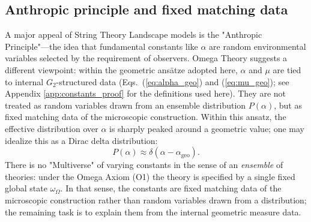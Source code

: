 \subsection{Anthropic principle and fixed matching data}
A major appeal of String Theory Landscape models is the "Anthropic Principle"---the idea that fundamental constants like $\alpha$ are random environmental variables selected by the requirement of observers.
Omega Theory suggests a different viewpoint: within the geometric ans\"atze adopted here, $\alpha$ and $\mu$ are tied to internal $G_2$-structured data (Eqs.~(\ref{eq:alpha_geo}) and (\ref{eq:mu_geo}); see Appendix \ref{app:constants_proof} for the definitions used here). They are not treated as random variables drawn from an ensemble distribution $P(\alpha)$, but as fixed matching data of the microscopic construction.
Within this ansatz, the effective distribution over $\alpha$ is sharply peaked around a geometric value; one may idealize this as a Dirac delta distribution:
\begin{equation}
    P(\alpha) \approx \delta(\alpha - \alpha_{\text{geo}}).
\end{equation}
There is no "Multiverse" of varying constants in the sense of an \emph{ensemble} of theories: under the Omega Axiom (O1) the theory is specified by a single fixed global state $\omega_\Omega$. In that sense, the constants are fixed matching data of the microscopic construction rather than random variables drawn from a distribution; the remaining task is to explain them from the internal geometric measure data.

